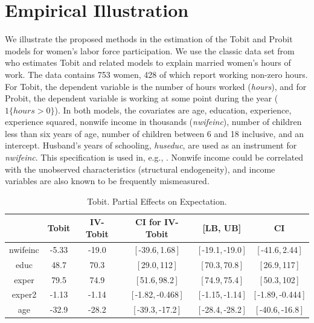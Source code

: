 \documentclass[11pt]{article}
\begin{document}
\section{Empirical Illustration\label{sec:Empirical}}

We illustrate the proposed methods in the estimation of the Tobit and Probit
models for women's labor force participation. We use the classic data set
from \cite{Mroz1987Ecta} who estimates Tobit and related models to explain
married women's hours of work. The data contains 753 women, 428 of which
report working non-zero hours. For Tobit, the dependent variable is the
number of hours worked (\textit{hours}), and for Probit, the dependent
variable is working at some point during the year ($1\{hours>0\}$). In both
models, the covariates are age, education, experience, experience squared,
nonwife income in thousands (\textit{nwifeinc}), number of children less
than six years of age, number of children between 6 and 18 inclusive, and an
intercept. Husband's years of schooling, \textit{huseduc}, are used as an
instrument for \textit{nwifeinc}. This specification is used in, e.g., \cite%
{Wooldridge2010Book}. Nonwife income could be correlated with the unobserved
characteristics (structural endogeneity), and income variables are also
known to be frequently mismeasured.

\begin{table}[!h]
  \begin{center}
  \begin{tabular}{|c|c|cc|cc|}
    \hline\hline
   &  Tobit & IV-Tobit & CI for IV-Tobit & [LB, UB] & CI \\ \hline
    nwifeinc &  -5.33 & -19.0 & [\,-39.6,\,1.68\,] & [\,-19.1,\,-19.0\,] & [\,-41.6,\,2.44\,]\\ 
    educ &  48.7 & 70.3 & [\,29.0,\,112\,] & [\,70.3,\,70.8\,] & [\,26.9,\,117\,]\\ 
    exper &  79.5 & 74.9 & [\,51.6,\,98.2\,] & [\,74.9,\,75.4\,] & [\,50.3,\,102\,]\\ 
    exper2 &  -1.13 & -1.14 & [\,-1.82,\,-0.468\,] & [\,-1.15,\,-1.14\,] & [\,-1.89,\,-0.444\,]\\ 
    age &  -32.9 & -28.2 & [\,-39.3,\,-17.2\,] & [\,-28.4,\,-28.2\,] & [\,-40.6,\,-16.8\,]\\ 
  \hline\hline
  \end{tabular}
  \caption{Tobit. Partial Effects on Expectation.}
  \label{table:Emp-Tobit-PEM-E-w-CI}
  \end{center}
\end{table}
\end{document}
